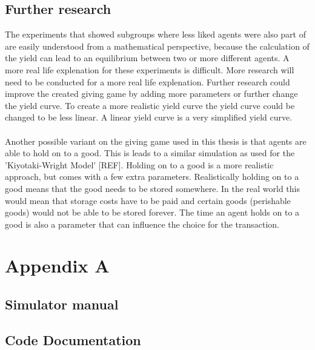 \documentclass[twoside,openright]{uva-bachelor-thesis}
\begin{document}
\section{Further research}
The experiments that showed subgroups where less liked agents were also part of are easily understood from a mathematical perspective, because the calculation of the yield can lead to an equilibrium between two or more different agents. A more real life explenation for these experiments is difficult. More research will need to be conducted for a more real life explenation. Further research could improve the created giving game by adding more parameters or further change the yield curve. To create a more realistic yield curve the yield curve could be changed to be less linear. A linear yield curve is a very simplified yield curve. 
\\
\\
Another possible variant on the giving game used in this thesis is that agents are able to hold on to a good. This is leads to a similar simulation as used for the 'Kiyotaki-Wright Model' [REF]. Holding on to a good is a more realistic approach, but comes with a few extra parameters. Realistically holding on to a good means that the good needs to be stored somewhere. In the real world this would mean that storage costs have to be paid and certain goods (perishable goods) would not be able to be stored forever. The time an agent holds on to a good is also a parameter that can influence the choice for the transaction.

\chapter{Appendix A}

\section{Simulator manual}

\section{Code Documentation}
\end{document}
